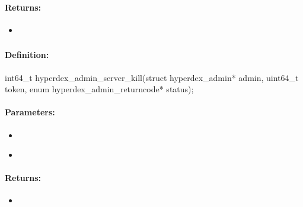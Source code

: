 \paragraph{Returns:}
\begin{itemize}[noitemsep]
\item {}\\

\end{itemize}

\pagebreak
\subsubsection{}
\label{api:c:server_kill}


\paragraph{Definition:}
\begin{ccode}
int64_t hyperdex_admin_server_kill(struct hyperdex_admin* admin,
        uint64_t token,
        enum hyperdex_admin_returncode* status);
\end{ccode}

\paragraph{Parameters:}
\begin{itemize}[noitemsep]
\item {}\\

\item {}\\

\end{itemize}

\paragraph{Returns:}
\begin{itemize}[noitemsep]
\item {}\\

\end{itemize}

